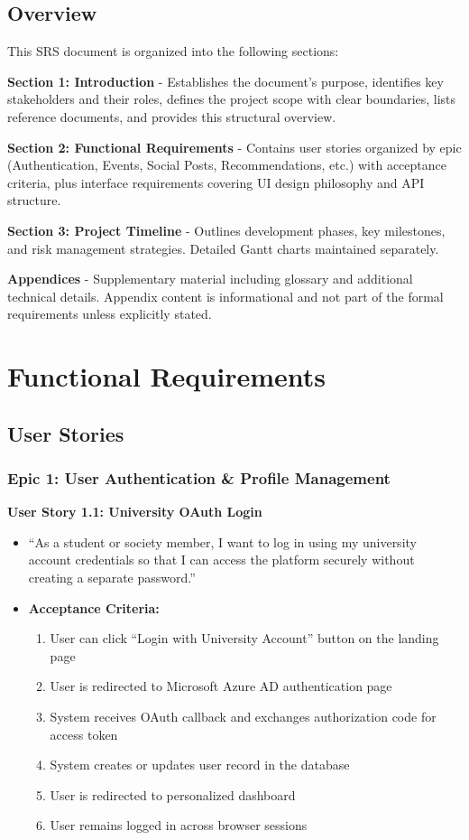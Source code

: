 \documentclass[12pt,a4paper]{article}
\begin{document}
\subsection{Overview}

This SRS document is organized into the following sections:

\textbf{Section 1: Introduction} - Establishes the document's purpose, identifies key stakeholders and their roles, defines the project scope with clear boundaries, lists reference documents, and provides this structural overview.

\textbf{Section 2: Functional Requirements} - Contains user stories organized by epic (Authentication, Events, Social Posts, Recommendations, etc.) with acceptance criteria, plus interface requirements covering UI design philosophy and API structure.

\textbf{Section 3: Project Timeline} - Outlines development phases, key milestones, and risk management strategies. Detailed Gantt charts maintained separately.

\textbf{Appendices} - Supplementary material including glossary and additional technical details. Appendix content is informational and not part of the formal requirements unless explicitly stated.

\newpage
\section{Functional Requirements}

\subsection{User Stories}

\subsubsection{Epic 1: User Authentication \& Profile Management}

\textbf{User Story 1.1: University OAuth Login}
\begin{itemize}
    \item ``As a student or society member, I want to log in using my university account credentials so that I can access the platform securely without creating a separate password.''
    \item \textbf{Acceptance Criteria:}
    \begin{enumerate}
        \item User can click ``Login with University Account'' button on the landing page
        \item User is redirected to Microsoft Azure AD authentication page
        \item System receives OAuth callback and exchanges authorization code for access token
        \item System creates or updates user record in the database
        \item User is redirected to personalized dashboard
        \item User remains logged in across browser sessions
    \end{enumerate}
\end{itemize}
\end{document}

